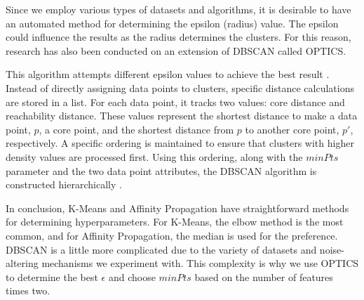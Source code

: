Since we employ various types of datasets and algorithms, it is desirable to have an automated method for determining the epsilon (radius) value.
The epsilon could influence the results as the radius determines the clusters.
For this reason, research has also been conducted on an extension of DBSCAN called OPTICS.

This algorithm attempts different epsilon values to achieve the best result \citep{ankerst_optics_nodate}.
Instead of directly assigning data points to clusters, specific distance calculations are stored in a list.
For each data point, it tracks two values: core distance and reachability distance.
These values represent the shortest distance to make a data point, $p$, a core point, and the shortest distance from $p$ to another core point, $p'$, respectively.
A specific ordering is maintained to ensure that clusters with higher density values are processed first.
Using this ordering, along with the $minPts$ parameter and the two data point attributes, the DBSCAN algorithm is constructed hierarchically \citep{schubert_dbscan_2017}. \newline

In conclusion, K-Means and Affinity Propagation have straightforward methods for determining hyperparameters.
For K-Means, the elbow method is the most common, and for Affinity Propagation, the median is used for the preference.
DBSCAN is a little more complicated due to the variety of datasets and noise-altering mechanisms we experiment with.
This complexity is why we use OPTICS to determine the best $\epsilon$ and choose $minPts$ based on the number of features times two.

